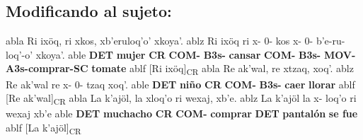 \documentclass{article}%
\begin{document}
\subsection{Modificando al sujeto:}%
\label{subsec:Modificandoalsujeto}%

%
\ex
  	abla Ri ixöq, ri xkos, xb'eruloq'o' xkoya'.
  	ablz Ri ixöq ri x- 0- kos x- 0- b'e-ru-loq'-o' xkoya'.
  	able \textbf{DET} \textbf{mujer} \textbf{CR} \textbf{COM-} \textbf{B3s-} \textbf{cansar} \textbf{COM-} \textbf{B3s-} \textbf{MOV-A3s-comprar-SC} \textbf{tomate}
  	ablf [Ri ixöq]\textsubscript{CR}
\ex
  	abla Re ak'wal, re xtzaq, xoq'.
  	ablz Re ak'wal re x- 0- tzaq xoq'.
  	able \textbf{DET} \textbf{niño} \textbf{CR} \textbf{COM-} \textbf{B3s-} \textbf{caer} \textbf{llorar}
  	ablf [Re ak'wal]\textsubscript{CR}
\ex
  	abla La k'ajöl, la xloq'o ri wexaj, xb'e.
  	ablz La k'ajöl la x- loq'o ri wexaj xb'e
  	able \textbf{DET} \textbf{muchacho} \textbf{CR} \textbf{COM-} \textbf{comprar} \textbf{DET} \textbf{pantalón} \textbf{se fue}
  	ablf [La k'ajöl]\textsubscript{CR}
\end{document}
